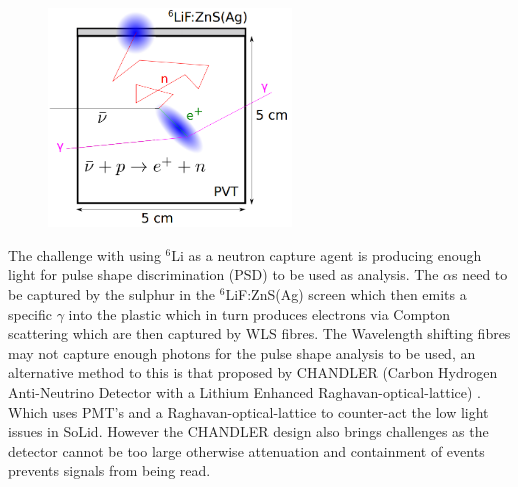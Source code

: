 \begin{figure}[htbp]
 \centering
 \includegraphics[height=58mm]{Chapter2/Figs/Raster/SoLid_cube.png}
 \label{fig:SolidCubeDiagram}
\end{figure}

The challenge with using $^6$Li as a neutron capture agent is producing enough light for pulse shape discrimination (PSD) to be used as analysis. The $\alpha$s need to be captured by the sulphur in the $^6$LiF:ZnS(Ag) screen which then emits a specific $\gamma$ into the plastic which in turn produces electrons via Compton scattering which are then captured by WLS fibres. The Wavelength shifting fibres may not capture enough photons for the pulse shape analysis to be used, an alternative method to this is that proposed by CHANDLER (Carbon Hydrogen Anti-Neutrino Detector with a Lithium Enhanced Raghavan-optical-lattice) \cite{aap2015}. Which uses PMT's and a Raghavan-optical-lattice to counter-act the low light issues in SoLid. However the CHANDLER design also brings challenges as the detector cannot be too large otherwise attenuation and containment of events prevents signals from being read. 

